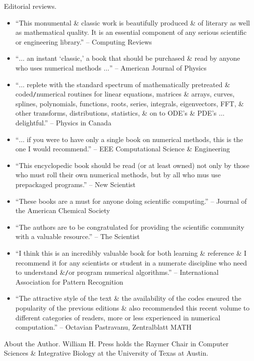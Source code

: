 \documentclass{article}
\begin{document}
\begin{enumerate}
	{\sf Editorial reviews.}
	\begin{itemize}
		\item ``This monumental \& classic work is beautifully produced \& of literary as well as mathematical quality. It is an essential component of any serious scientific or engineering library.'' -- Computing Reviews
		\item ``$\ldots$ an instant `classic,' a book that should be purchased \& read by anyone who uses numerical methods $\ldots$'' -- American Journal of Physics
		\item ``$\ldots$ replete with the standard spectrum of mathematically pretreated \& coded{\tt/}numerical routines for linear equations, matrices \& arrays, curves, splines, polynomials, functions, roots, series, integrals, eigenvectors, FFT, \& other transforms, distributions, statistics, \& on to ODE's \& PDE's $\ldots$ delightful.'' -- Physics in Canada
		\item ``$\ldots$ if you were to have only a single book on numerical methods, this is the one I would recommend.'' -- EEE Computational Science \& Engineering
		\item ``This encyclopedic book should be read (or at least owned) not only by those who must roll their own numerical methods, but by all who mus use prepackaged programs.'' -- New Scientist
		\item ``These books are a must for anyone doing scientific computing.'' -- Journal of the American Chemical Society
		\item ``The authors are to be congratulated for providing the scientific community with a valuable resource.'' -- The Scientist
		\item ``I think this is an incredibly valuable book for both learning \& reference \& I recommend it for any scientists or student in a numerate discipline who need to understand \&{\tt/}or program numerical algorithms.'' -- International Association for Pattern Recognition
		\item ``The attractive style of the text \& the availability of the codes ensured the popularity of the previous editions \& also recommended this recent volume to different categories of readers, more or less experienced in numerical computation.'' -- {\sc Octavian Pastravanu}, Zentralblatt MATH
	\end{itemize}
	{\sf About the Author.} {\sc William H. Press} holds the Raymer Chair in Computer Sciences \& Integrative Biology at the University of Texas at Austin.


\end{enumerate}
\end{document}
